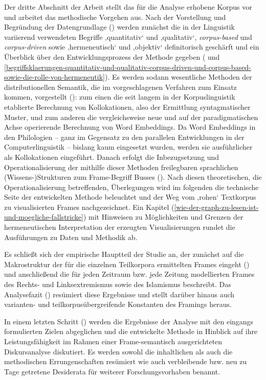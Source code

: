 Der dritte Abschnitt der Arbeit stellt das für die Analyse erhobene Korpus vor und arbeitet das methodische Vorgehen aus. Nach der Vorstellung und Begründung der Datengrundlage () werden zunächst die in der Linguistik variierend verwendeten Begriffe ‚quantitativ` und ‚qualitativ`, \emph{corpus-based} und \emph{corpus-driven} sowie ‚hermeneutisch` und ‚objektiv` definitorisch geschärft und ein Überblick über den Entwicklungsprozess der Methode gegeben ( und \ref{begriffsklaerungen-quantitativ-und-qualitativ-corpus-driven-und-corpus-based-sowie-die-rolle-von-hermeneutik}). Es werden sodann wesentliche Methoden der distributionellen Semantik, die im vorgeschlagenen Verfahren zum Einsatz kommen, vorgestellt (): zum einen die seit langem in der Korpuslinguistik etablierte Berechnung von Kollokationen, also der Ermittlung syntagmatischer Muster, und zum anderen die vergleichsweise neue und auf der paradigmatischen Achse operierende Berechnung von Word Embeddings. Da Word Embeddings in den Philologien -- ganz im Gegensatz zu den parallelen Entwicklungen in der Computerlinguistik -- bislang kaum eingesetzt wurden, werden sie ausführlicher als Kollokationen eingeführt. Danach erfolgt die Inbezugsetzung und Operationalisierung der mithilfe dieser Methoden freilegbaren sprachlichen (Wissens\mbox{-})Strukturen zum Frame-Begriff Busses (). Nach diesen theoretischen, die Operationalisierung betreffenden, Überlegungen wird im folgenden  die technische Seite der entwickelten Methode beleuchtet und der Weg vom ‚rohen` Textkorpus zu visualisierten Frames nachgezeichnet. Ein Kapitel (\ref{wie-der-graph-zu-lesen-ist-und-moegliche-fallstricke}) mit Hinweisen zu Möglichkeiten und Grenzen der hermeneutischen Interpretation der erzeugten Visualisierungen rundet die Ausführungen zu Daten und Methodik ab.

Es schließt sich der empirische Hauptteil der Studie an, der zunächst auf die Makrostruktur der für die einzelnen Teilkorpora ermittelten Frames eingeht () und anschließend die für jeden Zeitraum bzw. jede Zeitung modellierten Frames des Rechts- und Linksextremismus sowie des Islamismus beschreibt. Das Analysefazit () resümiert diese Ergebnisse und stellt darüber hinaus auch varianten- und teilkorpusübergreifende Konstanten des Framings heraus.

In einem letzten Schritt () werden die Ergebnisse der Analyse mit den eingangs formulierten Zielen abgeglichen und die entwickelte Methode in Hinblick auf ihre Leistungsfähigkeit im Rahmen einer Frame-semantisch ausgerichteten Diskursanalyse diskutiert. Es werden sowohl die inhaltlichen als auch die methodischen Errungenschaften resümiert wie auch verbleibende bzw. neu zu Tage getretene Desiderata für weiterer Forschungsvorhaben benannt.
